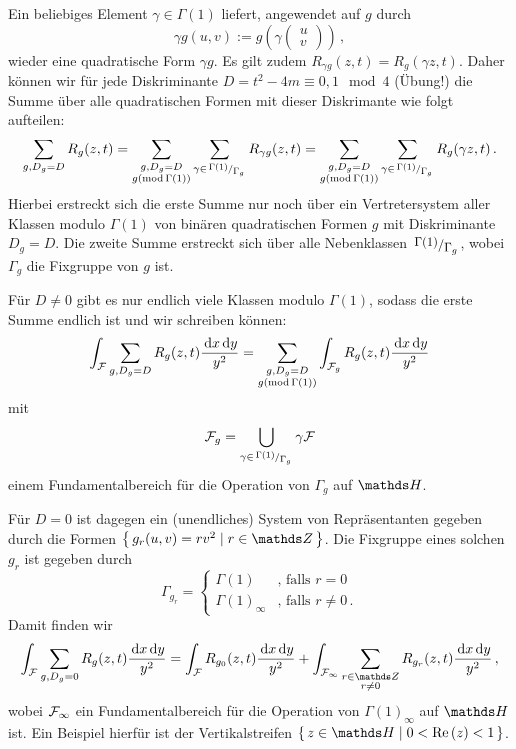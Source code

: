 \begin{bewe}
Ein beliebiges Element $\gamma \in \Gamma(1)$ liefert, angewendet auf $g$ durch
\[
	\gamma g (u, v) := g \left( \gamma \begin{pmatrix}u\\v\end{pmatrix} \right)
	\,,
\]
wieder eine quadratische Form $\gamma g$. Es gilt zudem $R_{\gamma g} (z, t) = R_g (\gamma z, t)$. Daher können wir für jede Diskriminante $D = t^2 - 4m \equiv 0,1 \mod 4$ (Übung!) die Summe über alle quadratischen Formen mit dieser Diskrimante wie folgt aufteilen:
\[
	\sum_{g, D_g = D} R_g (z, t) = \sum_{\substack{g, D_g = D \\ g (\operatorname{mod} \Gamma(1))}} \sum_{\gamma \in \modulo {\Gamma(1)} {\Gamma_g}} R_{\gamma g} (z,t) = \sum_{\substack{g, D_g = D \\ g (\operatorname{mod} \Gamma(1))}} \sum_{\gamma \in \modulo {\Gamma(1)} {\Gamma_g}} R_g (\gamma z,t)
	\,.
\]
Hierbei erstreckt sich die erste Summe nur noch über ein Vertretersystem aller Klassen modulo $\Gamma(1)$ von binären quadratischen Formen $g$ mit Diskriminante $D_g = D$. Die zweite Summe erstreckt sich über alle Nebenklassen $\modulo {\Gamma(1)}{\Gamma_g}$, wobei $\Gamma_g$ die Fixgruppe von $g$ ist. 

Für $D \neq 0$ gibt es nur endlich viele Klassen modulo $\Gamma(1)$, sodass die erste Summe endlich ist und wir schreiben können:
\begin{equation}\label{eq:intFsumGforDneq0}
	\int_{\mathcal{F}} \sum_{g, D_g = D} R_g(z,t) \frac{\,\mathrm{d} x \,\mathrm{d} y}{y^2} = \sum_{\substack{g, D_g = D \\ g (\operatorname{mod} \Gamma(1))}} \int_{\mathcal{F}_g} R_g (z,t) \frac{\,\mathrm{d} x \,\mathrm{d} y}{y^2}
\end{equation}
mit 
\[
	\F_g = \bigcup_{\gamma \in \modulo {\Gamma(1)}{\Gamma_g}} \gamma \F
\]
einem Fundamentalbereich für die Operation von $\Gamma_g$ auf $\HH$.

Für $D = 0$ ist dagegen ein (unendliches) System von Repräsentanten gegeben durch die Formen $\Set {g_r(u,v) = rv^2 \mid r \in \ZZ }$. Die Fixgruppe eines solchen $g_r$ ist gegeben durch
\[
	\Gamma_{g_r} = \begin{cases} \Gamma(1) &\text{, falls } r = 0\\ \Gamma(1)_\infty &\text{, falls } r \neq 0 \,. \end{cases}
\]
Damit finden wir
\begin{equation}\label{eq:intFsumGforD=0}
	\int_\F \sum_{g, D_g = 0} R_g(z,t) \frac{\opd x \opd y}{y^2} = \int_\F R_{g_0} (z,t) \frac{\opd x \opd y}{y^2} + \int_{\F_\infty} \sum_{\substack{r \in \ZZ \\ r \neq 0}} R_{g_r}(z,t) \frac{\opd x \opd y}{y^2}
	\,,
\end{equation}
wobei $\mathcal{F}_\infty$ ein Fundamentalbereich für die Operation von $\Gamma(1)_\infty$ auf $\HH$ ist. Ein Beispiel hierfür ist der Vertikalstreifen $\Set {z \in \HH \mid 0 < \Re (z) < 1}$.


\end{bewe}
